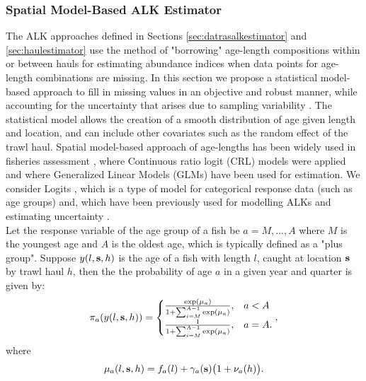\documentclass[a4paper 12pt]{article}
\numberwithin{equation}{section}
\begin{document}
\subsubsection{Spatial Model-Based ALK Estimator}
\label{sec:spatialModelALK}
The ALK approaches defined in Sections \ref{sec:datrasalkestimator} and \ref{sec:haulestimator} use the method of "borrowing" age-length compositions within or between hauls for estimating abundance indices when data points for age-length combinations are missing. In this section we propose a statistical model-based approach to fill in missing values in an objective and robust manner, while accounting for the uncertainty that arises due to sampling variability \citep{berg2012spatial}. The statistical model allows the creation of a smooth distribution of age given length and location, and can include other covariates such as the random effect of the trawl haul. Spatial model-based approach of age-lengths has been widely used in fisheries assessment \citep{berg2012spatial, kvist2000using, rindorf2001analyses}, where Continuous ratio logit (CRL) models were applied and where Generalized Linear Models (GLMs) have been used for estimation. We consider Logits \citep{dyke1952analysis,agresti2003categorical}, which is a type of model for categorical response data (such as age groups) and, which have been previously used for modelling ALKs and estimating uncertainty \citep{gerritsen2006simple}.  \\
\indent Let the response variable of the age group of a fish be $a = M,...,A$ where $M$ is the youngest age and $A$ is the oldest age, which is typically defined as a "plus group". Suppose $y(l,{\bf s},h)$ is the age  of a fish with length $l$, caught at location ${\bf s}$ by trawl haul $h$, then the the probability of age $a$ in a given year and quarter is given by:
\begin{align}
\pi_a(y(l,{\bf s},h)) =
\begin{cases}
\frac{\exp(\mu_a)}{1+ \sum_{i = M}^{A-1} \exp(\mu_a)} ,& a<A \\
\frac{1}{1+ \sum_{i = M}^{A-1} \exp(\mu_a)},& a=A.
\end{cases},
\label{model}
\end{align}
where 
\begin{align}\label{eq:linearPred}
\mu_a(l,{\bf s},h) = f_a(l)  + \gamma_a({\bf s}) \big(1+ \nu_a(h)\big).
\end{align}
\end{document}
